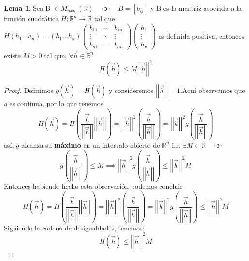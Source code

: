 \documentclass[letterpaper]{article}
\providecommand{\norm}[1]{\left|\left|#1\right|\right|}
\newcommand{\tq}{ \quad \cdot  \backepsilon \cdot \quad }
\newcommand{\R}{\mathds{R}}
\renewcommand{\*}{\cdot}
\theoremstyle{definition}
\newtheorem{lema}{Lema}
\begin{document}
	\begin{lema}
		Sea B $ \in M_{nxm}(\R) \tq B = [b_{ij}]$ y B es la maatriz asociada a la función cuadrática $ H: \R^n \to \R $ tal que $ H(h_1 \dots h_n) = (h_1 \dots h_n) \begin{pmatrix}
		b_{11} & \cdots & b_{1n}\\ 
		\vdots & \ddots & \vdots \\
		b_{n1} & \cdots & b_{nn}
		\end{pmatrix} \begin{pmatrix}
		h_1 \\
		\vdots\\
		h_n
		\end{pmatrix} $ es definida positiva, entonces existe $ M > 0$ tal que, $ \forall \vec{h} \in \R^n $ \[ H(\vec{h}) \leq M \norm{\vec{h}}^2 \]
	\end{lema}
\begin{proof}
	Definimos $ g(\vec{h}) = H(\vec{h}) $ y consideremos $ \norm{\vec{h}} = 1 $.Aquí observamos que $ g $ es continua, por lo que tenemos
	\[ H(\vec{h}) = H\left( \dfrac{\vec{h}}{\norm{\vec{h}}} \norm{\vec{h}} \right) = \norm{\vec{h}}^2\left( \dfrac{\vec{h}}{\norm{\vec{h}}} \right) = \norm{\vec{h}}^2g\left(\dfrac{\vec{h}}{\norm{\vec{h}}}\right) \]
	así, $ g $ alcanza su \textbf{máximo} en un intervalo abierto de $ \R^n $ i.e. $ \exists M \in \R \tq$ $$ g\left(\dfrac{\vec{h}}{\norm{\vec{h}}}\right) \leq M \implies \norm{\vec{h}}^2g\left(\dfrac{\vec{h}}{\norm{\vec{h}}}\right) \leq \norm{\vec{h}}^2M $$ 
	Entonces habiendo hecho esta observación podemos concluir
	\[ H(\vec{h}) = H\left( \dfrac{\vec{h}}{\norm{\vec{h}}} \norm{\vec{h}} \right) = \norm{\vec{h}}^2\left( \dfrac{\vec{h}}{\norm{\vec{h}}} \right) = \norm{\vec{h}}^2g\left(\dfrac{\vec{h}}{\norm{\vec{h}}}\right)\leq \norm{\vec{h}}^2M  \]
	Siguiendo la cadena de desigualdades, tenemos:
	\[ H(\vec{h}) \leq \norm{\vec{h}}^2M \]
\end{proof}
\end{document}
